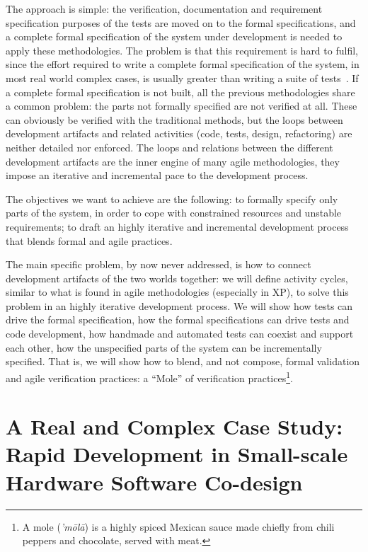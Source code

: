 \documentclass{article}
\begin{document}
The approach is simple: the verification, documentation and requirement specification purposes of the tests are moved on to the formal specifications, and a complete formal specification of the system under development is needed to apply these methodologies.
The problem is that this requirement is hard to fulfil, since the effort required to write a complete formal specification of the system, in most real world complex cases, is usually greater than writing a suite of tests~\cite{Glass2002}.
If a complete formal specification is not built, all the previous methodologies share a common problem: the parts not formally specified are not verified at all.
These can obviously be verified with the traditional methods, but the loops between development artifacts and related activities (code, tests, design, refactoring) are neither detailed nor enforced.
The loops and relations between the different development artifacts are the inner engine of many agile methodologies, they impose an iterative and incremental pace to the development process.

The objectives we want to achieve are the following: to formally specify only parts of the system, in order to cope with constrained resources and unstable requirements; to draft an highly iterative and incremental development process that blends formal and agile practices.

The main specific problem, by now never addressed, is how to connect development artifacts of the two worlds together: we will define activity cycles, similar to what is found in agile methodologies (especially in XP), to solve this problem in an highly iterative development process.
We will show how tests can drive the formal specification, how the formal specifications can drive tests and code development, how handmade and automated tests can coexist and support each other, how the unspecified parts of the system can be incrementally specified.
That is, we will show how to blend, and not compose, formal validation and agile verification practices: a ``Mole'' of verification practices\footnote{A mole (\emph{'m\=ol\=a}) is a highly spiced Mexican sauce made chiefly from chili peppers and chocolate, served with meat.}.



\section{A Real and Complex Case Study: \\ Rapid Development in Small-scale Hardware Software Co-design}
\label{subsec:a_real_and_complex_case_study}
\end{document}
